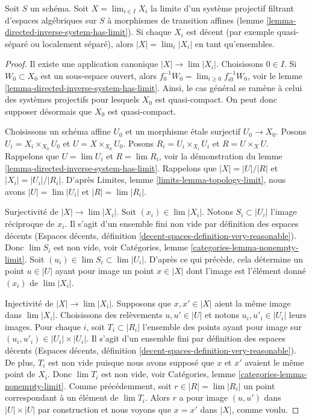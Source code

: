 \begin{lemma}
\label{lemma-inverse-limit-sets}
Soit $S$ un schéma. Soit $X = \lim_{i \in I} X_i$ la limite d'un système projectif filtrant
d'espaces algébriques sur $S$ à morphismes de transition affines
(lemme \ref{lemma-directed-inverse-system-has-limit}). Si chaque $X_i$
est décent (par exemple quasi-séparé ou localement séparé),
alors $|X| = \lim_i |X_i|$ en tant qu'ensembles.
\end{lemma}

\begin{proof}
Il existe une application canonique $|X| \to \lim |X_i|$. Choisissons $0 \in I$.
Si $W_0 \subset X_0$ est un sous-espace ouvert, alors
$f_0^{-1}W_0 = \lim_{i \geq 0} f_{i0}^{-1}W_0$, voir
le lemme \ref{lemma-directed-inverse-system-has-limit}.
Ainsi, le cas général se ramène à celui des systèmes projectifs pour lesquels $X_0$
est quasi-compact. On peut donc supposer
désormais que $X_0$ est quasi-compact.

\medskip\noindent
Choisissons un schéma affine $U_0$ et un morphisme \'etale surjectif $U_0 \to X_0$.
Posons $U_i = X_i \times_{X_0} U_0$ et $U = X \times_{X_0} U_0$.
Posons $R_i = U_i \times_{X_i} U_i$ et $R = U \times_X U$.
Rappelons que $U = \lim U_i$ et $R = \lim R_i$, voir la démonstration du
lemme \ref{lemma-directed-inverse-system-has-limit}.
Rappelons que $|X| = |U|/|R|$ et $|X_i| = |U_i|/|R_i|$. D'après
Limites, lemme \ref{limits-lemma-topology-limit}, nous avons
$|U| = \lim |U_i|$ et $|R| = \lim |R_i|$.

\medskip\noindent
Surjectivité de $|X| \to \lim |X_i|$. Soit $(x_i) \in \lim |X_i|$. Notons
$S_i \subset |U_i|$ l'image réciproque de $x_i$. Il s'agit d'un ensemble fini non vide
par définition des espaces décents
(Espaces décents, définition \ref{decent-spaces-definition-very-reasonable}).
Donc $\lim S_i$ est non vide, voir
Catégories, lemme \ref{categories-lemma-nonempty-limit}.
Soit $(u_i) \in \lim S_i \subset \lim |U_i|$. D'après ce qui précède, cela détermine
un point $u \in |U|$ ayant pour image un point $x \in |X|$ dont l'image est l'élément donné
$(x_i)$ de $\lim |X_i|$.

\medskip\noindent
Injectivité de $|X| \to \lim |X_i|$. Supposons que $x, x' \in |X|$
aient la même image dans $\lim |X_i|$. Choisissons des relèvements $u, u' \in |U|$
et notons $u_i, u'_i \in |U_i|$ leurs images.
Pour chaque $i$, soit $T_i \subset |R_i|$ l'ensemble des points ayant pour image
sur $(u_i, u'_i) \in |U_i| \times |U_i|$. Il s'agit d'un ensemble fini
par définition des espaces décents
(Espaces décents, définition \ref{decent-spaces-definition-very-reasonable}).
De plus, $T_i$ est non vide puisque nous avons supposé que $x$ et $x'$ avaient
le même point de $X_i$. Donc $\lim T_i$ est non vide, voir
Catégories, lemme \ref{categories-lemma-nonempty-limit}.
Comme précédemment, soit $r \in |R| = \lim |R_i|$ un point correspondant à un
élément de $\lim T_i$. Alors $r$ a pour image $(u, u')$ dans $|U| \times |U|$
par construction et nous voyons que $x = x'$ dans $|X|$, comme voulu.


\end{proof}
